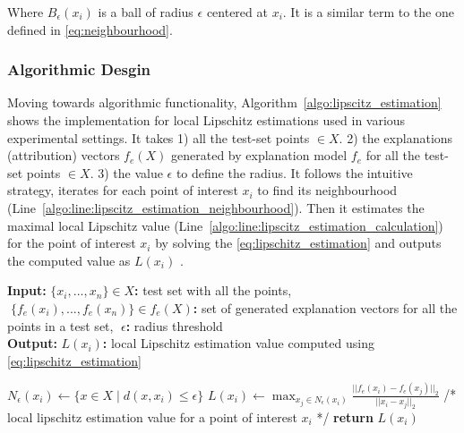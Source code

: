 \documentclass[english]{tktltiki2}
\theoremstyle{definition}
\theoremstyle{remark}
\newcommand{\multicommentsymbolstart}{/*}
\newcommand{\multicommentsymbolend}{*/}
\newcommand{\MultiLineComment}[2][\algorithmicindent]{\Statex \hspace{#1}\multicommentsymbolstart{} #2 \multicommentsymbolend{}}
\newcommand{\onespace}{\;}
\begin{document}
Where $B_{\epsilon}(x_{i})$ is a ball of radius $\epsilon$ centered at $x_i$. It is a similar term to the one defined in \eqref{eq:neighbourhood}. 

\subsubsection{Algorithmic Desgin}\label{sec:algorithmic_desgin} %
Moving towards algorithmic functionality, Algorithm~\ref{algo:lipscitz_estimation} shows the implementation for local Lipschitz estimations used in various experimental settings. It takes 1) all the test-set points $ \in X$. 2) the explanations (attribution) vectors $f_e(X)$ generated by explanation model $f_e$  for all the test-set points $\in X$. 3) the value $\epsilon$ to define the radius. It follows the intuitive strategy, iterates for each point of interest $x_i$ to find its neighbourhood (Line~\ref{algo:line:lipscitz_estimation_neighbourhood}). Then it estimates the maximal local Lipschitz value (Line~\ref{algo:line:lipscitz_estimation_calculation}) for the point of interest $x_i$ by solving the \eqref{eq:lipschitz_estimation} and outputs the computed value as $L(x_i)$ .

\begin{algorithm}[H]
	\caption{$LipschitzEstimations(X,\onespace f_e(X),\onespace \epsilon)$}
	\label{algo:lipscitz_estimation}
	\hspace*{\algorithmicindent} \textbf{Input}\textbf{:} $\{x_i,...,x_n\} \in X$\textbf{:} test set with all the points, $\onespace \{f_e(x_i),...,f_e(x_n)\} \in f_e(X)$\textbf{:} set of generated explanation vectors for all the points in a test set, $\onespace \epsilon$\textbf{:} radius threshold \\
	\hspace*{\algorithmicindent} \textbf{Output}\textbf{:} $L(x_i)$\textbf{:} local Lipschitz estimation value computed using \eqref{eq:lipschitz_estimation}
	\begin{algorithmic}[1]
		\State \label{algo:line:lipscitz_estimation_neighbourhood} $N_\epsilon(x_i)\leftarrow \{x\in X\mid d(x,x_i)\le \epsilon\}$ \Comment {\eqref{eq:neighbourhood}}
		\State \label{algo:line:lipscitz_estimation_calculation} $L(x_i) \gets \operatorname*{max}_{x_j \in N_\epsilon(x_i)} \frac{||f_e(x_i) - f_e(x_j)||_2}{||x_i - x_j||_2}$ \Comment {\eqref{eq:lipschitz_estimation}}
		\EndFor
		\MultiLineComment[0\dimexpr\algorithmicindent]{local lipschitz estimation value for a point of interest $x_i$}
		\State \textbf{return} $L(x_i)$
	\end{algorithmic}
\end{algorithm}
\end{document}
